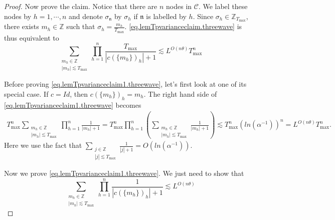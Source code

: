 \begin{proof}
Now prove the claim. Notice that there are $n$ nodes in $\mathcal{C}$. We label these nodes by $h=1,\cdots,n$ and denote $\sigma_{\mathfrak{n}}$ by $\sigma_{h}$ if $\mathfrak{n}$ is labelled by $h$. Since $\sigma_{h}\in \mathbb{Z}_{T_{\text{max}}}$, there exists $m_{h}\in \mathbb{Z}$ such that $\sigma_{h}=\frac{m_{h}}{T_{\text{max}}}$. \eqref{eq.lemTpvarianceclaim.threewave} is thus equivalent to 
\begin{equation}\label{eq.lemTpvarianceclaim1.threewave}
    \sum_{\substack{m_{h}\in \mathbb{Z}\\ |m_{h}|\lesssim  T_{\text{max}}}} \prod_{h=1}^{n}\frac{T_{\text{max}}}{|c(\{m_{h}\})_{h}|+1}\lesssim L^{O(n\theta)}T^{n}_{\text{max}}
\end{equation}

Before proving \eqref{eq.lemTpvarianceclaim1.threewave}, let's first look at one of its special case. If $c=Id$, then $c(\{m_{h}\})_{h}=m_h$. The right hand side of \eqref{eq.lemTpvarianceclaim1.threewave} becomes
\begin{equation}
\begin{split}
    T^{n}_{\text{max}}\sum_{\substack{m_{h}\in \mathbb{Z}\\ |m_{h}|\lesssim  T_{\text{max}}}} \prod_{h=1}^{n}\frac{1}{|m_{h}|+1} = T^{n}_{\text{max}}\prod_{h=1}^{n}\left(\sum_{\substack{m_{h}\in \mathbb{Z}\\ |m_{h}|\lesssim  T_{\text{max}}}} \frac{1}{|m_{h}|+1}\right)
    \lesssim T^{n}_{\text{max}} (ln(\alpha^{-1}))^{n}= L^{O(n\theta)}T^{n}_{\text{max}}.
\end{split}
\end{equation}
Here we use the fact that $\sum_{\substack{j\in \mathbb{Z}\\ |j|\lesssim  T_{\text{max}}}} \frac{1}{|j|+1}=O(ln(\alpha^{-1}))$.

Now we prove \eqref{eq.lemTpvarianceclaim1.threewave}. We just need to show that 
\begin{equation}\label{eq.lemTpvarianceEulerMac.threewave}
    \sum_{\substack{m_{h}\in \mathbb{Z}\\ |m_{h}|\lesssim  T_{\text{max}}}} \prod_{h=1}^{n}\frac{1}{|c(\{m_{h}\})_{h}|+1}\lesssim L^{O(n\theta)}
\end{equation}


\end{proof}
